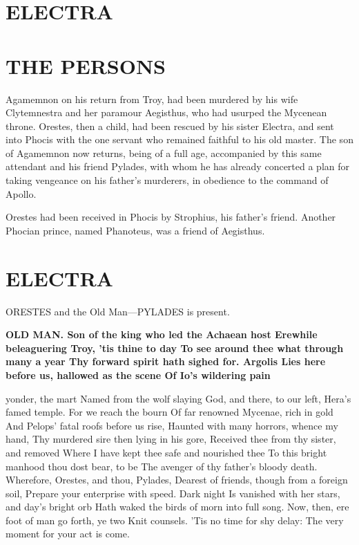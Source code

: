 \documentclass[11pt,letter]{book}
\begin{document}
\section{ELECTRA}\section{THE PERSONS} 
\par  [page 130] Agamemnon on his return from Troy, had been murdered by his wife Clytemnestra and her paramour Aegisthus, who had usurped the Mycenean throne. Orestes, then a child, had been rescued by his sister Electra, and sent into Phocis with the one servant who remained faithful to his old master. The son of Agamemnon now returns, being of a full age, accompanied by this same attendant and his friend Pylades, with whom he has already concerted a plan for taking vengeance on his father’s murderers, in obedience to the command of Apollo.

\par  Orestes had been received in Phocis by Strophius, his father’s friend. Another Phocian prince, named Phanoteus, was a friend of Aegisthus.

\par  [page 131]
\section{ELECTRA}
\par  ORESTES and the Old Man—PYLADES is present.

\par \textbf{OLD MAN. Son of the king who led the Achaean host Erewhile beleaguering Troy, ’tis thine to day To see around thee what through many a year Thy forward spirit hath sighed for. Argolis Lies here before us, hallowed as the scene Of Io’s wildering pain}
\par   yonder, the mart Named from the wolf slaying God, and there, to our left, Hera’s famed temple. For we reach the bourn Of far renowned Mycenae, rich in gold And Pelops’ fatal roofs before us rise, Haunted with many horrors, whence my hand, Thy murdered sire then lying in his gore, Received thee from thy sister, and removed Where I have kept thee safe and nourished thee To this bright manhood thou dost bear, to be The avenger of thy father’s bloody death. Wherefore, Orestes, and thou, Pylades, Dearest of friends, though from a foreign soil, Prepare your enterprise with speed. Dark night Is vanished with her stars, and day’s bright orb Hath waked the birds of morn into full song. Now, then, ere foot of man go forth, ye two Knit counsels. ’Tis no time for shy delay:  The very moment for your act is come.
\end{document}
